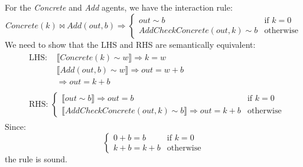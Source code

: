 \begin{lemma}
	For the \textit{Concrete} and \textit{Add} agents, we have the interaction rule:
	$$
	\mathit{Concrete}(k) \bowtie \mathit{Add}(\mathit{out}, b) \Rightarrow
	\begin{cases}
		\mathit{out} \sim b & \text{if } k = 0 \\
		\mathit{AddCheckConcrete}(\mathit{out}, k) \sim b & \text{otherwise}
	\end{cases}
	$$
	We need to show that the LHS and RHS are semantically equivalent:
	$$
	\begin{aligned}
		& \begin{aligned}
			\text{LHS: } & \llbracket \mathit{Concrete}(k) \sim w \rrbracket \Rightarrow k = w \\
			& \llbracket \mathit{Add}(\mathit{out}, b) \sim w \rrbracket \Rightarrow \mathit{out} = w + b \\
			& \Rightarrow \mathit{out} = k + b
		\end{aligned} \\
		& \begin{aligned}
			\text{RHS: }
			\begin{cases}
				\llbracket \mathit{out} \sim b \rrbracket \Rightarrow \mathit{out} = b & \text{if } k = 0 \\
				\llbracket \mathit{AddCheckConcrete}(\mathit{out}, k) \sim b \rrbracket \Rightarrow \mathit{out} = k + b & \text{otherwise}
			\end{cases}
		\end{aligned}
	\end{aligned}
	$$
	Since:
	$$
	\begin{cases}
		0 + b = b & \text{if } k = 0 \\
		k + b = k + b & \text{otherwise}
	\end{cases}
	$$
	the rule is sound.
\end{lemma}

